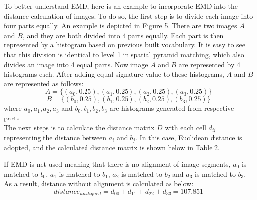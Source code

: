 \noindent To better understand EMD, here is an example to incorporate EMD into the distance calculation of images. To do so, the first step is to divide each image into four parts equally. An example is depicted in Figure 5. There are two images $A$ and $B$, and they are both divided into 4 parts equally. Each part is then represented by a histogram based on previous built vocabulary. It is easy to see that this division is identical to level 1 in spatial pyramid matching, which also divides an image into 4 equal parts. Now image $A$ and $B$ are represented by 4 histograms each. After adding equal signature value to these histograms, $A$ and $B$ are represented as follows:
	$$A = \{(a_0, 0.25), (a_1, 0.25), (a_2, 0.25), (a_3, 0.25)\}$$
	$$B = \{(b_0, 0.25), (b_1, 0.25), (b_2, 0.25), (b_3, 0.25)\}$$
where $a_0, a_1, a_2, a_3$ and $b_0, b_1, b_2, b_3$ are histograms generated from respective parts.\\

\noindent The next steps is to calculate the distance matrix $D$ with each cell $d_{ij}$ representing the distance between $a_i$ and $b_j$. In this case, Euclidean distance is adopted, and the calculated distance matrix is shown below in Table 2.

\begin{table}[!ht]
    \begin{center}
    \end{center}
    \caption{Distance matrix between image $A$ and $B$}
\end{table}

\noindent If EMD is not used meaning that there is no alignment of image segments, $a_0$ is matched to $b_0$, $a_1$ is matched to $b_1$, $a_2$ is matched to $b_2$ and $a_3$ is matched to $b_3$. As a result, distance without alignment is calculated as below: $$distance_{unaligned} = d_{00} + d_{11} + d_{22} + d_{33} = 107.851$$

